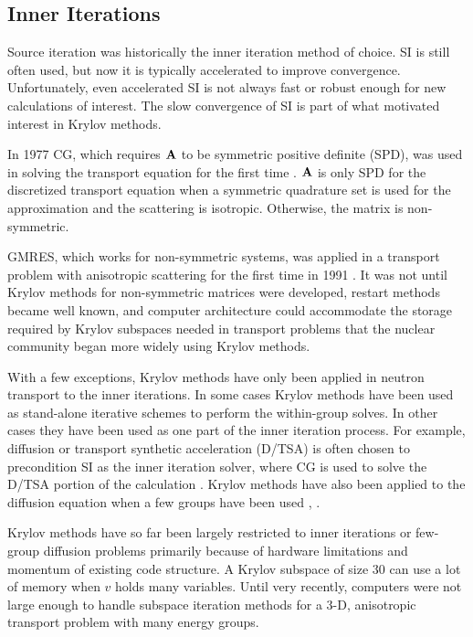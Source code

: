 \subsection{Inner Iterations}
Source iteration was historically the inner iteration method of choice. SI is still often used, but now it is typically accelerated to improve convergence. Unfortunately, even accelerated SI is not always fast or robust enough for new calculations of interest. The slow convergence of SI is part of what motivated interest in Krylov methods. 

In 1977 CG, which requires $\mathbf{A}$ to be symmetric positive definite (SPD), was used in solving the transport equation for the first time \cite{Lewis1977}. $\mathbf{A}$ is only SPD for the discretized transport equation when a symmetric quadrature set is used for the \Sn approximation and the scattering is isotropic. Otherwise, the matrix is non-symmetric. 

GMRES, which works for non-symmetric systems, was applied in a transport problem with anisotropic scattering for the first time in 1991 \cite{Adams2002}. It was not until Krylov methods for non-symmetric matrices were developed, restart methods became well known, and computer architecture could accommodate the storage required by Krylov subspaces needed in transport problems that the nuclear community began more widely using Krylov methods. 

With a few exceptions, Krylov methods have only been applied in neutron transport to the inner iterations. In some cases Krylov methods have been used as stand-alone iterative schemes to perform the within-group solves. In other cases they have been used as one part of the inner iteration process. For example, diffusion or transport synthetic acceleration (D/TSA) is often chosen to precondition SI as the inner iteration solver, where CG is used to solve the D/TSA portion of the calculation \cite{Gupta2004}. Krylov methods have also been applied to the diffusion equation when a few groups have been used \cite{Suetomi1988}, \cite{Verdu1999}.

Krylov methods have so far been largely restricted to inner iterations or few-group diffusion problems primarily because of hardware limitations and momentum of existing code structure. A Krylov subspace of size 30 can use a lot of memory when $v$ holds many variables. Until very recently, computers were not large enough to handle subspace iteration methods for a 3-D, anisotropic transport problem with many energy groups.  

